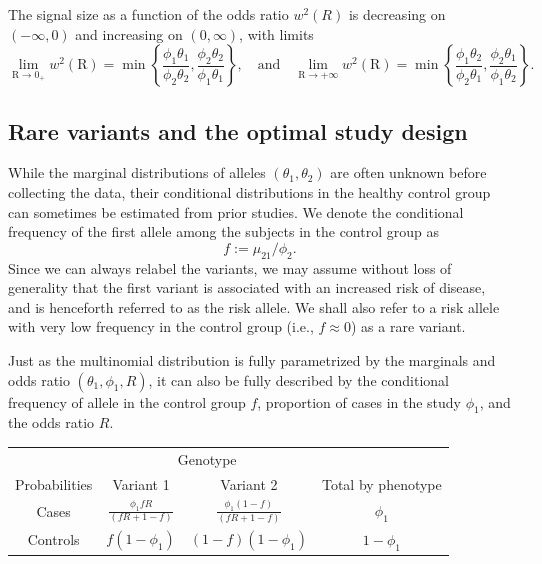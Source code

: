 \begin{corollary} \label{cor:signal-limits-OR}
The signal size as a function of the odds ratio $w^2(R)$ is decreasing on $(-\infty,0)$ and increasing on $(0,\infty)$, with limits
\begin{equation} \label{eq:signal-size-upper-bound}
    \lim_{\text{R}\to0_+} w^2(\text{R}) = \min\left\{\frac{\phi_1\theta_1}{\phi_2\theta_2}, \frac{\phi_2\theta_2}{\phi_1\theta_1}\right\},
\quad
\text{and}
\quad
    \lim_{\text{R}\to+\infty} w^2(\text{R}) = \min\left\{\frac{\phi_1\theta_2}{\phi_2\theta_1}, \frac{\phi_2\theta_1}{\phi_1\theta_2}\right\}.
\end{equation}
\end{corollary}


\subsection{Rare variants and the optimal study design}
\label{subsec:optimal-design} 

While the marginal distributions of alleles $(\theta_1, \theta_2)$ are often unknown before collecting the data, their conditional distributions in the healthy control group can sometimes be estimated from prior studies.
We denote the conditional frequency of the first allele among the subjects in the control group as
$$
f := \mu_{21} / \phi_2.
$$
Since we can always relabel the variants, we may assume without loss of generality that the first variant is associated with an increased risk of disease, and is henceforth referred to as the risk allele.
We shall also refer to a risk allele with very low frequency in the control group (i.e., $f\approx 0$) as a rare variant.

Just as the multinomial distribution is fully parametrized by the marginals and odds ratio  $(\theta_1, \phi_1, R)$, it can also be fully described by the conditional frequency of allele in the control group $f$, proportion of cases in the study $\phi_1$, and the odds ratio $R$.

\begin{center}
    \begin{tabular}{cccc}
    \hline
    & \multicolumn{2}{c}{Genotype} \\
    \cline{2-3}
    Probabilities & Variant 1 & Variant 2 & Total by phenotype \\
    \hline
    Cases & $\frac{\phi_1fR}{(fR+1-f)}$ & $\frac{\phi_1(1-f)}{(fR+1-f)}$ & $\phi_1$ \\
    Controls & $f(1-\phi_1)$ & $(1-f)(1-\phi_1)$ & $1-\phi_1$ \\
    \hline
    \end{tabular}
\end{center}

